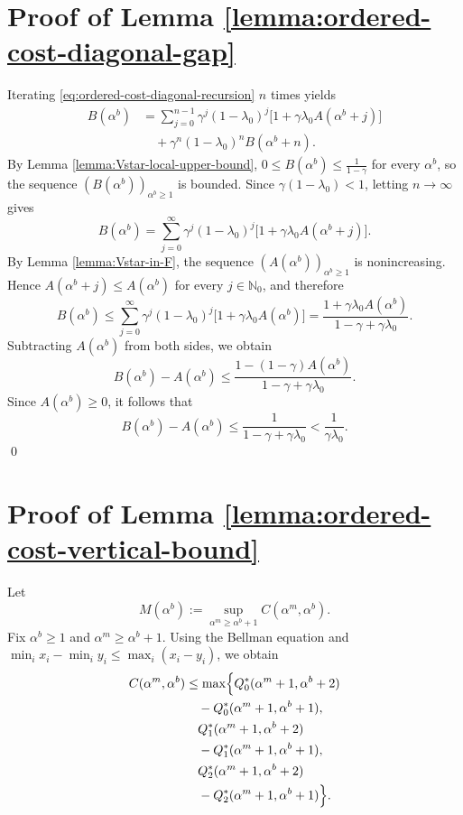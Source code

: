 \documentclass[letterpaper,journal]{IEEEtran}
\begin{document}
\section{Proof of Lemma \ref{lemma:ordered-cost-diagonal-gap}}
\label{app:ordered-cost-diagonal-gap}

Iterating \eqref{eq:ordered-cost-diagonal-recursion} $n$ times yields
\[
\begin{aligned}
B(\alpha^b)&=\sum_{j=0}^{n-1} \gamma^j(1-\lambda_0)^j
\bigl[1+\gamma\lambda_0A(\alpha^b+j)\bigr]\\
&\quad+\gamma^n(1-\lambda_0)^n B(\alpha^b+n).
\end{aligned}
\]
By Lemma \ref{lemma:Vstar-local-upper-bound}, $0\leq B(\alpha^b)\leq \frac{1}{1-\gamma}$ for every $\alpha^b$, so the sequence $(B(\alpha^b))_{\alpha^b\geq 1}$ is bounded. Since $\gamma(1-\lambda_0)<1$, letting $n\to\infty$ gives
\[
B(\alpha^b)=\sum_{j=0}^{\infty} \gamma^j(1-\lambda_0)^j\bigl[1+\gamma\lambda_0A(\alpha^b+j)\bigr].
\]
By Lemma \ref{lemma:Vstar-in-F}, the sequence $(A(\alpha^b))_{\alpha^b\geq 1}$ is nonincreasing. Hence $A(\alpha^b+j)\le A(\alpha^b)$ for every $j\in\mathbb N_0$, and therefore
\[
B(\alpha^b)\leq \sum_{j=0}^{\infty} \gamma^j(1-\lambda_0)^j\bigl[1+\gamma\lambda_0A(\alpha^b)\bigr]=\frac{1+\gamma\lambda_0A(\alpha^b)}{1-\gamma+\gamma\lambda_0}.
\]
Subtracting $A(\alpha^b)$ from both sides, we obtain
\[
B(\alpha^b)-A(\alpha^b)\leq \frac{1-(1-\gamma)A(\alpha^b)}{1-\gamma+\gamma\lambda_0}.
\]
Since $A(\alpha^b)\geq 0$, it follows that
\[
B(\alpha^b)-A(\alpha^b) \leq \frac{1}{1-\gamma+\gamma\lambda_0} < \frac{1}{\gamma\lambda_0}.
\]\qed


\section{Proof of Lemma \ref{lemma:ordered-cost-vertical-bound}}
\label{app:ordered-cost-vertical-bound}
Let
\[
M(\alpha^b):=\sup_{\alpha^m\ge \alpha^b+1} C(\alpha^m,\alpha^b).
\]
Fix $\alpha^b\ge 1$ and $\alpha^m\ge \alpha^b+1$. Using the Bellman equation and $\min_i x_i-\min_i y_i\le \max_i(x_i-y_i)$, we obtain
\begin{align*}
C(\alpha^m,\alpha^b)
&\le \max\Bigl\{Q_0^*(\alpha^m+1,\alpha^b+2)\\
&\quad -Q_0^*(\alpha^m+1,\alpha^b+1),\\
&\quad Q_1^*(\alpha^m+1,\alpha^b+2)\\
&\quad -Q_1^*(\alpha^m+1,\alpha^b+1),\\
&\quad Q_2^*(\alpha^m+1,\alpha^b+2)\\
&\quad -Q_2^*(\alpha^m+1,\alpha^b+1)\Bigr\}.
\end{align*}
\end{document}
